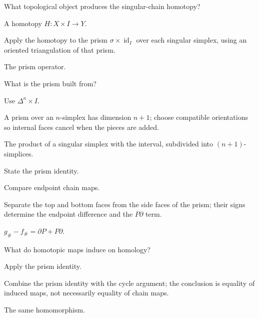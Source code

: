 \begin{exercise}\label{exr:viii20-04}
What topological object produces the singular-chain homotopy?
\end{exercise}
\begin{hint}
A homotopy \(H:X\times I\to Y\).

Apply the homotopy to the prism \(\sigma\times\operatorname{id}_I\) over each singular simplex, using an oriented triangulation of that prism.
\end{hint}
\begin{solution}
The prism operator.
\end{solution}

\begin{exercise}\label{exr:viii20-05}
What is the prism built from?
\end{exercise}
\begin{hint}
Use \(\Delta^n\times I\).

A prism over an \(n\)-simplex has dimension \(n+1\); choose compatible orientations so internal faces cancel when the pieces are added.
\end{hint}
\begin{solution}
The product of a singular simplex with the interval, subdivided into \((n+1)\)-simplices.
\end{solution}

\begin{exercise}\label{exr:viii20-06}
State the prism identity.
\end{exercise}
\begin{hint}
Compare endpoint chain maps.

Separate the top and bottom faces from the side faces of the prism; their signs determine the endpoint difference and the \(P\partial\) term.
\end{hint}
\begin{solution}
\(g_\#-f_\#=\partial P+P\partial\).
\end{solution}

\begin{exercise}\label{exr:viii20-07}
What do homotopic maps induce on homology?
\end{exercise}
\begin{hint}
Apply the prism identity.

Combine the prism identity with the cycle argument; the conclusion is equality of induced maps, not necessarily equality of chain maps.
\end{hint}
\begin{solution}
The same homomorphism.
\end{solution}

